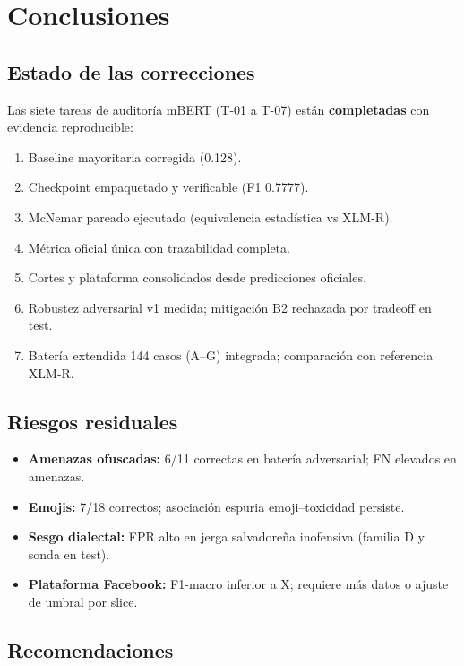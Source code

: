 \chapter{Conclusiones}

\section{Estado de las correcciones}

Las siete tareas de auditoría mBERT (T-01 a T-07) están \textbf{completadas} con evidencia reproducible:

\begin{enumerate}[noitemsep]
  \item Baseline mayoritaria corregida (0.128).
  \item Checkpoint empaquetado y verificable (F1 0.7777).
  \item McNemar pareado ejecutado (equivalencia estadística vs XLM-R).
  \item Métrica oficial única con trazabilidad completa.
  \item Cortes y plataforma consolidados desde predicciones oficiales.
  \item Robustez adversarial v1 medida; mitigación B2 rechazada por tradeoff en test.
  \item Batería extendida 144 casos (A--G) integrada; comparación con referencia XLM-R.
\end{enumerate}

\section{Riesgos residuales}

\begin{itemize}[noitemsep]
  \item \textbf{Amenazas ofuscadas:} 6/11 correctas en batería adversarial; FN elevados en amenazas.
  \item \textbf{Emojis:} 7/18 correctos; asociación espuria emoji--toxicidad persiste.
  \item \textbf{Sesgo dialectal:} FPR alto en jerga salvadoreña inofensiva (familia D y sonda en test).
  \item \textbf{Plataforma Facebook:} F1-macro inferior a X; requiere más datos o ajuste de umbral por slice.
\end{itemize}

\section{Recomendaciones}


